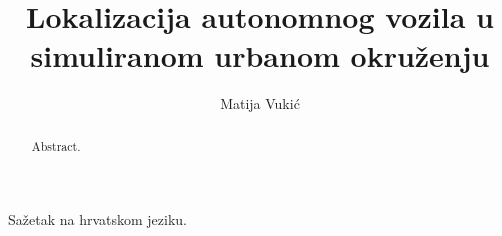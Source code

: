 \documentclass[times, utf8, diplomski]{fer}
\begin{document}

\title{Lokalizacija autonomnog vozila u simuliranom urbanom okruženju}

\author{Matija Vukić}

\maketitle

\izvornik


\tableofcontents








\begin{sazetak}
Sažetak na hrvatskom jeziku.

\end{sazetak}

\begin{abstract}
Abstract.

\end{abstract}
\end{document}
